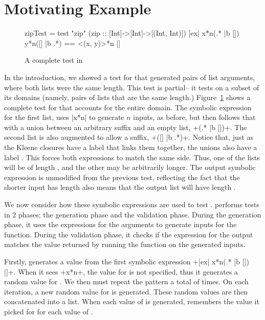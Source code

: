 \section{Motivating Example} \label{sec:motivating-example}

\begin{figure}
\begin{smallhskcode}
zipTest = test "zip" (zip :: [Int]->[Int]->[(Int, Int)])
        [ex| x*{n}(.* |{b} []) y*{n}([] |{b} .*) == <(x, y)>*{n} |] 
\end{smallhskcode}
\caption{A complete  test in \ourDSL}
\label{fig:zip-complete-test}
\end{figure}

In the introduction,
we showed a test for 
that generated pairs of list arguments,
where both lists were the same length.
This test is partial--
it tests  on a subset of its domains
(namely, pairs of lists that are the same length.)
Figure~\ref{fig:zip-complete-test}
shows a complete test for 
that accounts for the entire domain.
The symbolic expression for the first list,
uses \hskin|x*{n}| to generate $n$ inputs,
as before, but then follows that with
a union between an arbitrary suffix and an empty list,
\hskin+(.* |{b} [])+.
The second list
is also augmented to allow a suffix,
\hskin+([] |{b} .*)+.
Notice that, just as the Kleene closures have a label
 that links them together,
the unions also have a label .
This forces both expressions to match the same side.
Thus, one of the lists will be of length ,
and the other may be arbitrarily longer.
The output symbolic expression is unmodified from
the previous  test,
reflecting the fact that the shorter input has length 
also means that the output list will have length .

We now consider how these symbolic expressions
are used to test .
\ourDSL performs tests in 2 phases; the generation phase and the validation phase.
During the generation phase, it uses the expressions for the arguments to generate inputs for the function.
During the validation phase, it checks if the expression for the output matches the value returned by running the function on the generated inputs.

Firstly, \ourDSL generates a value from the first symbolic expression \hskin+[ex| x*{n}(.* |{b} []) |]+.
When it sees \hskin+x*{n}+,
the value for  is not specified,
thus it generates a random value for .
We then must repeat the pattern  a total of  times.
On each iteration, a new 
random value for  is generated.
These random values are then concatenated into a list.
When each value of  is generated, \ourDSL remembers
the value it picked for  for each value of .

